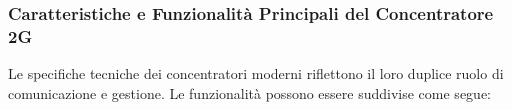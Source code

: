 \subsubsection{Caratteristiche e Funzionalità Principali del Concentratore 2G}

Le specifiche tecniche \cite{chian2-e-dist} dei concentratori moderni riflettono il loro duplice ruolo di comunicazione e gestione. Le funzionalità possono essere suddivise come segue:


